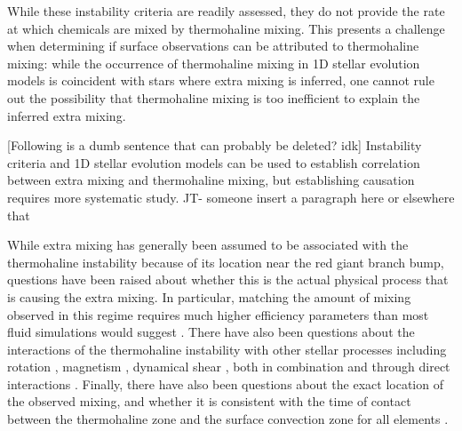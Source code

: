 While these instability criteria are readily assessed, they do not provide the rate at which chemicals are mixed by thermohaline mixing. 
This presents a challenge when determining if surface observations can be attributed to thermohaline mixing: while the occurrence of thermohaline mixing in 1D stellar evolution models is coincident with stars where extra mixing is inferred, one cannot rule out the possibility that thermohaline mixing is too inefficient to explain the inferred extra mixing. 


[Following is a dumb sentence that can probably be deleted? idk] Instability criteria and 1D stellar evolution models can be used to establish correlation between extra mixing and thermohaline mixing, but establishing causation requires more systematic study.
JT- someone insert a paragraph here or elsewhere that 

While extra mixing has generally been assumed to be associated with the thermohaline instability because of its location near the red giant branch bump, questions have been raised about whether this is the actual physical process that is causing the extra mixing. In particular, matching the amount of mixing observed in this regime requires much higher efficiency parameters than most fluid simulations would suggest \citep{Denissenkov2010thermohaline, denissenkov_merryfield_2011, traxler_etal_2011, brown_etal_2013, SenguptaGaraud2018, Garaud2019}. There have also been questions about the interactions of the thermohaline instability with other stellar processes including rotation \citep{Lagarde2011}, magnetism \citep{CharbonnelZahn2007}, dynamical shear \citep{CantielloLanger2010}, both in combination and through direct interactions \citep{Maeder2013, SenguptaGaraud2018}. Finally, there have also been questions about the exact location of the observed mixing, and whether it is consistent with the time of contact between the thermohaline zone and the surface convection zone for all elements \citep[see e.g.][J. Tayar \& M. Joyce, submitted]{Angelou2015, Henkel2017}.%

